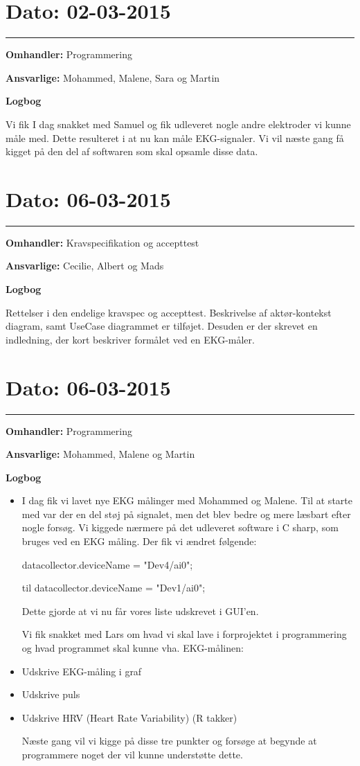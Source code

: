 \section{Dato: 02-03-2015}
\hrule 

\textbf{Omhandler:} Programmering

\textbf{Ansvarlige:} Mohammed, Malene, Sara og Martin

\textbf{Logbog}

Vi fik I dag snakket med Samuel og fik udleveret nogle andre elektroder vi kunne måle med. Dette resulteret i at nu kan måle EKG-signaler. Vi vil næste gang få kigget på den del af softwaren som skal opsamle disse data.


\section{Dato: 06-03-2015}
\hrule

\textbf{Omhandler:} Kravspecifikation og accepttest

\textbf{Ansvarlige:} Cecilie, Albert og Mads

\textbf{Logbog}

Rettelser i den endelige kravspec og accepttest. Beskrivelse af aktør-kontekst diagram, samt UseCase diagrammet er tilføjet. Desuden er der skrevet en indledning, der kort beskriver formålet ved en EKG-måler.
 

\section{Dato: 06-03-2015}
\hrule

\textbf{Omhandler:} Programmering

\textbf{Ansvarlige:} Mohammed, Malene og Martin

\textbf{Logbog}

\begin{itemize}
	\item 
	I dag fik vi lavet nye EKG målinger med Mohammed og Malene. Til at starte med var der en del støj på signalet, men det blev bedre og mere læsbart efter nogle forsøg. Vi kiggede nærmere på det udleveret software i C sharp, som bruges ved en EKG måling. Der fik vi ændret følgende:
	
	datacollector.deviceName = "Dev4/ai0";
	
	til datacollector.deviceName = "Dev1/ai0";
	
	Dette gjorde at vi nu får vores liste udskrevet i GUI'en.
	
Vi fik snakket med Lars om hvad vi skal lave i forprojektet i programmering og hvad programmet skal kunne vha. EKG-målinen:

\item Udskrive EKG-måling i graf
\item Udskrive puls
\item Udskrive HRV (Heart Rate Variability) (R takker)

Næste gang vil vi kigge på disse tre punkter og forsøge at begynde at programmere noget der vil kunne understøtte dette.
	
\end{itemize}

